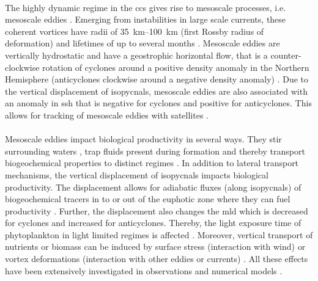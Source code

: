 \\
The highly dynamic regime in the \ac{ccs} gives rise to mesoscale processes, i.e. mesoscale eddies \autocite{kelly-1998-eke-obs}. Emerging from instabilities in large scale currents, these coherent vortices have radii of \SIrange{35}{100}{\kilo\metre} (first Rossby radius of deformation) and lifetimes of up to several months \autocite{kurian-2011-eddy-props}. Mesoscale eddies are vertically hydrostatic and have a geostrophic horizontal flow, that is a counter-clockwise rotation of cyclones around a positive density anomaly in the Northern Hemisphere (anticyclones clockwise around a negative density anomaly) \autocite{mcwilliams-2008-nature-eddies}. Due to the vertical displacement of isopycnals, mesoscale eddies are also associated with an anomaly in \ac{ssh} that is negative for cyclones and positive for anticyclones. This allows for tracking of mesoscale eddies with satellites \autocite{ducet-2000-first-ssh, chelton-2011}.\\
\\
Mesoscale eddies impact biological productivity in several ways. They stir surrounding waters \autocite{rossi-2008-stirring, chelton-2011-surfacechl}, trap fluids present during formation and thereby transport biogeochemical properties to distinct regimes \autocite{flierl-1981-trapping-theo, chelton-2011-surfacechl, nagai-2015-dom-role-meso}. In addition to lateral transport mechanisms, the vertical displacement of isopycnals impacts biological productivity. The displacement allows for adiabatic fluxes (along isopycnals) of biogeochemical tracers in to or out of the euphotic zone where they can fuel productivity \autocite{falkowski-1991-eddy-pumping, freilich-2019-w-decomp}. Further, the displacement also changes the \ac{mld} which is decreased for cyclones and increased for anticyclones. Thereby, the light exposure time of phytoplankton in light limited regimes is affected \autocite{mcgilli-2016-meso-review}. Moreover, vertical transport of nutrients or biomass can be induced by surface stress (interaction with wind) \autocite{stern-1965-eddy-wind, mcgilli-2008-response, gaube-2015-eddy-wind} or vortex deformations (interaction with other eddies or currents) \autocite{martin-2001-vert-vel-mesoeddies}. All these effects have been extensively investigated in observations \autocite{friedrichs-2009-calcs-npp-obs-sat, kahru-2009-calcs-npp-obs} and numerical models \autocite{nagai-2015-dom-role-meso, mcgilli-2016-meso-review, frischknecht-2018-3dpump}.\\
\\
